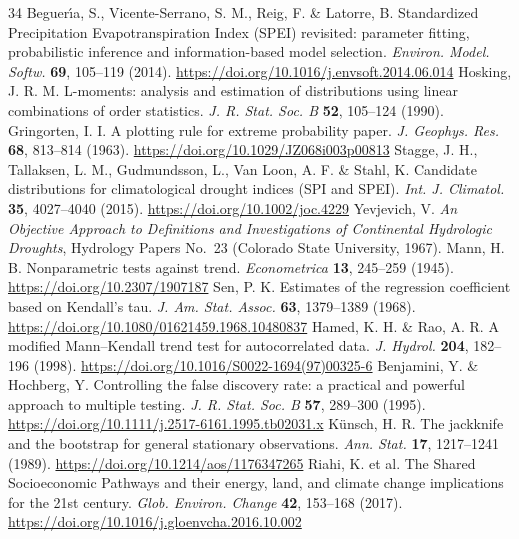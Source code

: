 \documentclass[11pt,a4paper]{article}
\begin{document}
\begin{thebibliography}{34}
 Beguer\'{\i}a, S., Vicente-Serrano, S. M., Reig, F. \& Latorre, B. Standardized Precipitation Evapotranspiration Index (SPEI) revisited: parameter fitting, probabilistic inference and information-based model selection. \textit{Environ. Model. Softw.} \textbf{69}, 105--119 (2014). \url{https://doi.org/10.1016/j.envsoft.2014.06.014}
 Hosking, J. R. M. L-moments: analysis and estimation of distributions using linear combinations of order statistics. \textit{J. R. Stat. Soc. B} \textbf{52}, 105--124 (1990).
 Gringorten, I. I. A plotting rule for extreme probability paper. \textit{J. Geophys. Res.} \textbf{68}, 813--814 (1963). \url{https://doi.org/10.1029/JZ068i003p00813}
 Stagge, J. H., Tallaksen, L. M., Gudmundsson, L., Van Loon, A. F. \& Stahl, K. Candidate distributions for climatological drought indices (SPI and SPEI). \textit{Int. J. Climatol.} \textbf{35}, 4027--4040 (2015). \url{https://doi.org/10.1002/joc.4229}
 Yevjevich, V. \textit{An Objective Approach to Definitions and Investigations of Continental Hydrologic Droughts}, Hydrology Papers No.~23 (Colorado State University, 1967).
 Mann, H. B. Nonparametric tests against trend. \textit{Econometrica} \textbf{13}, 245--259 (1945). \url{https://doi.org/10.2307/1907187}
 Sen, P. K. Estimates of the regression coefficient based on Kendall's tau. \textit{J. Am. Stat. Assoc.} \textbf{63}, 1379--1389 (1968). \url{https://doi.org/10.1080/01621459.1968.10480837}
 Hamed, K. H. \& Rao, A. R. A modified Mann--Kendall trend test for autocorrelated data. \textit{J. Hydrol.} \textbf{204}, 182--196 (1998). \url{https://doi.org/10.1016/S0022-1694(97)00325-6}
 Benjamini, Y. \& Hochberg, Y. Controlling the false discovery rate: a practical and powerful approach to multiple testing. \textit{J. R. Stat. Soc. B} \textbf{57}, 289--300 (1995). \url{https://doi.org/10.1111/j.2517-6161.1995.tb02031.x}
 K\"{u}nsch, H. R. The jackknife and the bootstrap for general stationary observations. \textit{Ann. Stat.} \textbf{17}, 1217--1241 (1989). \url{https://doi.org/10.1214/aos/1176347265}
 Riahi, K. et al. The Shared Socioeconomic Pathways and their energy, land, and climate change implications for the 21st century. \textit{Glob. Environ. Change} \textbf{42}, 153--168 (2017). \url{https://doi.org/10.1016/j.gloenvcha.2016.10.002}
\end{thebibliography}
\end{document}
